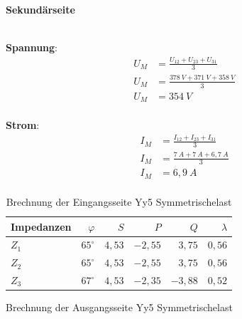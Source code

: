 \begin{enumerate}[label=\alph*)]
	      \textbf{Sekundärseite}\\ \ \\

	      \begin{tcolorbox}[colback=gray!30,
			      colframe=black,
			      width=0.9\textwidth,
		      ]
		      \parbox{\textwidth}{

			      \begin{minipage}{0.5\textwidth}
				      \textbf{Spannung}:
				      \begin{align*}
					      U_M & = \frac{U_{12} + U_{23} + U_{31}}{3} \\
					      U_M & = \frac{378\ V + 371\ V + 358\ V}{3} \\
					      U_M & = 354\ V                             \\
				      \end{align*}
			      \end{minipage}\hfill
			      \begin{minipage}{0.5\textwidth}
				      \textbf{Strom}:
				      \begin{align*}
					      I_M & = \frac{I_{12} + I_{23} + I_{31}}{3} \\
					      I_M & = \frac{7\ A + 7\ A + 6,7\ A}{3}     \\
					      I_M & = 6,9\ A                             \\
				      \end{align*}
			      \end{minipage}
		      }
	      \end{tcolorbox}
	      \begin{table}[h!]
		      \caption{Brechnung der Eingangsseite Yy5 Symmetrischelast}
		      \centering
		      \begin{tabular}{lrrrrr}
			      \hline
			      Impedanzen & $\varphi$    & $S$    & $P$      & $Q$      & $\lambda$ \\ \hline
			      $Z_1$      & $65^\circ$   & $4,53$ & $-2,55$  & $ 3,75 $ & $0,56$    \\
			      $Z_2$      & $65^\circ$   & $4,53$ & $-2,55 $ & $ 3,75$  & $0,56$    \\
			      $Z_3$      & $67^\circ  $ & $4,53$ & $-2,35$  & $ -3,88$ & $0,52$    \\ \hline
		      \end{tabular}
	      \end{table}
	      \begin{table}[h!]
		      \caption{Brechnung der Ausgangsseite Yy5 Symmetrischelast}

\end{table}
\end{enumerate}
